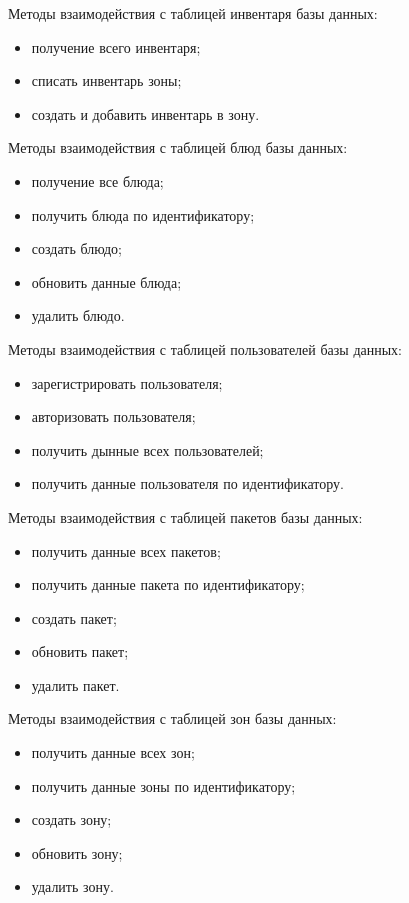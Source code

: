  Методы взаимодействия с таблицей инвентаря базы данных:
\begin{itemize}
	\item получение всего инвентаря;
	\item списать инвентарь зоны;
	\item создать и добавить инвентарь в зону.
\end{itemize}

Методы взаимодействия с таблицей блюд базы данных:
\begin{itemize}
	\item получение все блюда;
	\item получить блюда по идентификатору;
	\item создать блюдо;
	\item обновить данные блюда;
	\item удалить блюдо.
\end{itemize}

 Методы взаимодействия с таблицей пользователей базы данных:
\begin{itemize}
	\item зарегистрировать пользователя;
	\item авторизовать пользователя;
	\item получить дынные всех пользователей;
	\item получить данные пользователя по идентификатору.
\end{itemize}

 Методы взаимодействия с таблицей пакетов базы данных:
\begin{itemize}
	\item получить данные всех пакетов;
	\item получить данные пакета по идентификатору;
	\item создать пакет;
	\item обновить пакет;
	\item удалить пакет.
\end{itemize}

Методы взаимодействия с таблицей зон базы данных:
\begin{itemize}
	\item получить данные всех зон;
	\item получить данные зоны по идентификатору;
	\item создать зону;
	\item обновить зону;
	\item удалить зону.
\end{itemize}

